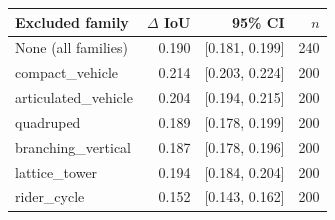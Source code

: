 \begin{tabular}{@{}lrrr@{}}
\toprule
Excluded family & $\Delta$ IoU & 95\% CI & $n$ \\
\midrule
None (all families) & 0.190 & [0.181, 0.199] & 240 \\
\midrule
compact\_vehicle & 0.214 & [0.203, 0.224] & 200 \\
articulated\_vehicle & 0.204 & [0.194, 0.215] & 200 \\
quadruped & 0.189 & [0.178, 0.199] & 200 \\
branching\_vertical & 0.187 & [0.178, 0.196] & 200 \\
lattice\_tower & 0.194 & [0.184, 0.204] & 200 \\
rider\_cycle & 0.152 & [0.143, 0.162] & 200 \\
\bottomrule
\end{tabular}
